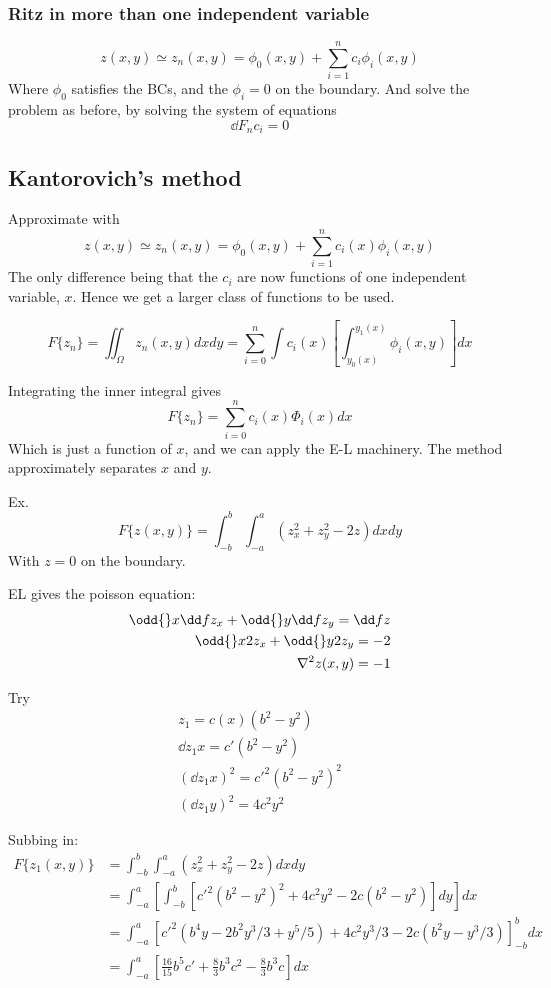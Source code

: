 \documentclass{E:/Documents/Latex/myassignment}
\begin{document}
\subsubsection{Ritz in more than one independent variable}
\[z(x,y) \simeq z_n(x,y) = \phi_0(x,y) + \sum_{i=1}^n c_i \phi_i (x,y)\]
Where $\phi_0$ satisfies the BCs, and the $\phi_i = 0$ on the boundary.
And solve the problem as before, by solving the system of equations
\[\dd{F_n}{c_i} = 0\]


\subsection{Kantorovich's method}
Approximate with
\[z(x,y) \simeq z_n(x,y) = \phi_0(x,y) + \sum_{i=1}^n c_i(x) \phi_i (x,y)\]
The only difference being that the $c_i$ are now functions of one independent variable, $x$. Hence we get a larger class of functions to be used.

\[F\{z_n\} = \iint_{\Omega} z_n(x,y) dx dy = \sum_{i=0}^n \int c_i(x) \left[\int _{y_0(x)}^{y_1(x)} \phi_i(x,y)\right] dx\]

Integrating the inner integral gives
\[F\{z_n\} = \sum_{i=0}^n c_i(x) \Phi_i(x) dx\]
Which is just a function of $x$, and we can apply the E-L machinery.
The method approximately separates $x$ and $y$.

Ex.
\[F\{z(x,y)\} = \int_{-b}^b \int_{-a}^a (z_x^2 + z_y^2 - 2z) dxdy\]
With $z=0$ on the boundary.

EL gives the poisson equation:
\begin{align*}
	\odd{}x \dd f{z_x} + \odd{}y \dd f{z_y} = \dd fz\\
	\odd{}x 2 z_x + \odd{}y 2z_y = -2\\
	\nabla^2 z(x,y) = -1
\end{align*}

Try
\begin{align*}
	z_1 = c(x)(b^2-y^2)\\
	\dd{z_1}{x} = c'(b^2-y^2)\\
	\left(\dd{z_1}{x}\right)^2 = c'^2 (b^2-y^2)^2\\
	\left(\dd{z_1}{y}\right)^2 = 4c^2 y^2
\end{align*}

Subbing in:
\begin{align*}
	F\{z_1(x,y)\} &= \int_{-b}^b \int_{-a}^a \left(z_x^2 + z_y^2 - 2z\right) dxdy\\
	&= \int_{-a}^a \left[\int_{-b}^b \left[c'^2 (b^2-y^2)^2 + 4c^2y^2 - 2c(b^2-y^2)\right]dy\right]dx\\
	&= \int_{-a}^a \left[c'^2 (b^4 y - 2b^2y^3/3 + y^5/5) + 4c^2 y^3/3 - 2c(b^2y - y^3/3)\right]_{-b}^b dx\\
	&= \int_{-a}^a \left[\frac{16}{15} b^5 c' + \frac83 b^3 c^2 - \frac83 b^3 c\right] dx
\end{align*}
\end{document}

